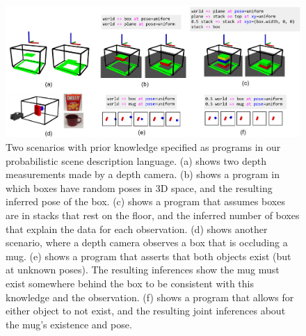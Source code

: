 \begin{figure}[t]
    \centering
    \includegraphics[width=\textwidth]{figures/lafi-fig.pdf}
    \caption{\small
Two scenarios with prior knowledge specified as programs in our probabilistic scene description language.
(a) shows two depth measurements made by a depth camera.
(b) shows a program in which boxes have random poses in 3D space, and the resulting inferred pose of the box.
(c) shows a program that assumes boxes are in stacks that rest on the floor, and the inferred number of boxes that explain the data for each observation.
(d) shows another scenario, where a depth camera observes a box that is occluding a mug.
(e) shows a program that asserts that both objects exist (but at unknown poses).
The resulting inferences show the mug must exist somewhere behind the box to be consistent with this knowledge and the observation.
(f) shows a program that allows for either object to not exist, and the resulting joint inferences about the mug's existence and pose.
}
    \label{fig:results}
\end{figure}


